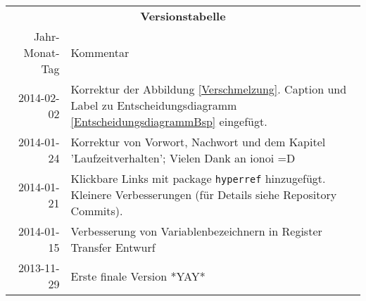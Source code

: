\begin{table}[htp]
\centering
\begin{tabularx}{\columnwidth}{rp{}}
\multicolumn{2}{c}{\textbf{Versionstabelle}} \\
Jahr-Monat-Tag & Kommentar \\ \hline
2014-02-02 & Korrektur der Abbildung \ref{Verschmelzung}.
Caption und Label zu Entscheidungsdiagramm \ref{EntscheidungsdiagrammBsp} eingefügt.
\\
2014-01-24 & Korrektur von Vorwort, Nachwort und dem Kapitel 'Laufzeitverhalten'; Vielen Dank an ionoi =D \\
2014-01-21 & Klickbare Links mit package \texttt{hyperref} hinzugefügt.
                     Kleinere Verbesserungen (für Details siehe Repository Commits).
\\
2014-01-15 & Verbesserung von Variablenbezeichnern in Register Transfer Entwurf \\
2013-11-29 & Erste finale Version *YAY* \\
\end{tabularx}
\end{table}
